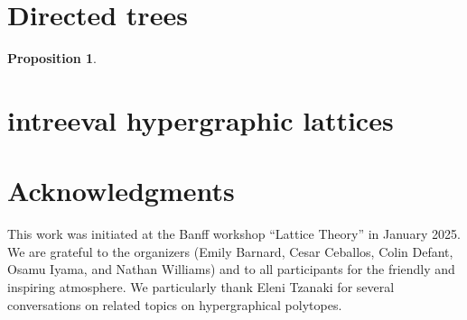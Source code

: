 \documentclass{amsart}
\newtheorem{proposition}[theorem]{Proposition}
\theoremstyle{definition}
\begin{document}
\section{Directed trees}
\label{sec:directedTrees}

\begin{proposition}
\end{proposition}



\section{intreeval hypergraphic lattices}
\label{sec:intreevalHypergraphicPosets}


\section*{Acknowledgments}

This work was initiated at the Banff workshop ``Lattice Theory'' in January 2025.
We are grateful to the organizers (Emily Barnard, Cesar Ceballos, Colin Defant, Osamu Iyama, and Nathan Williams) and to all participants for the friendly and inspiring atmosphere.
We particularly thank Eleni Tzanaki for several conversations on related topics on hypergraphical polytopes.




\label{sec:biblio}

\end{document}
